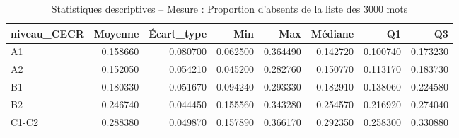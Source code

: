 \begin{table}
\caption{Statistiques descriptives – Mesure : Proportion d'absents de la liste des 3000 mots}
\label{tab:stats_PA_SUBTLEX_3000}
\begin{tabular}{lrrrrrrr}
\toprule
niveau_CECR & Moyenne & Écart_type & Min & Max & Médiane & Q1 & Q3 \\
\midrule
A1 & 0.158660 & 0.080700 & 0.062500 & 0.364490 & 0.142720 & 0.100740 & 0.173230 \\
A2 & 0.152050 & 0.054210 & 0.045200 & 0.282760 & 0.150770 & 0.113170 & 0.183730 \\
B1 & 0.180330 & 0.051670 & 0.094240 & 0.293330 & 0.182910 & 0.138060 & 0.224580 \\
B2 & 0.246740 & 0.044450 & 0.155560 & 0.343280 & 0.254570 & 0.216920 & 0.274040 \\
C1-C2 & 0.288380 & 0.049870 & 0.157890 & 0.366170 & 0.292350 & 0.258300 & 0.330880 \\
\bottomrule
\end{tabular}
\end{table}
